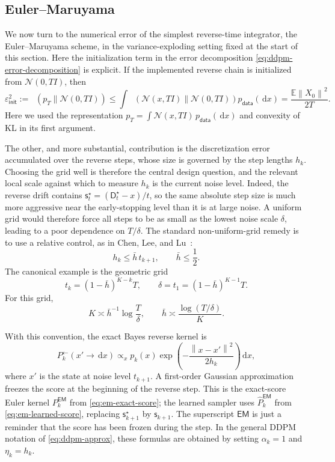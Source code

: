 \documentclass[10pt,a4paper]{amsart}
\numberwithin{equation}{section}
\DeclareMathOperator{\KL}{D_{\mathsf{KL}}}
\newcommand{\E}{\mathbb{E}}
\newcommand{\dd}{\,\mathrm{d}}
\newcommand{\Id}{I}
\newcommand{\wh}[1]{\widehat{#1}}
\newcommand{\norm}[1]{\left\lVert #1 \right\rVert}
\newcommand{\pdata}{p_{\mathsf{data}}}
\newcommand{\sstar}{\mathsf{s}^{\star}}
\newcommand{\score}{\mathsf{s}}
\newcommand{\dstar}{\mathsf{D}^{\star}}
\newcommand{\epsinit}{\varepsilon_{\mathsf{init}}}
\newcommand{\normal}[2]{\mathcal{N}\!\left(#1,#2\right)}
\begin{document}
\subsection{Euler--Maruyama}

We now turn to the numerical error of the simplest reverse-time integrator, the
Euler--Maruyama scheme, in the variance-exploding setting fixed at the start of
this section.  Here the initialization term in the error decomposition
\eqref{eq:ddpm-error-decomposition} is explicit.  If the implemented
reverse chain is initialized from $\normal{0}{T\Id}$, then
\begin{equation}\label{eq:ve-init-kl}
    \epsinit^2
    :=
    \KL(p_T\|\normal{0}{T\Id})
    \leq
    \int
    \KL\!\left(\normal{x}{T\Id}\middle\|\normal{0}{T\Id}\right)
    \pdata(\dd x)
    =
    \frac{\E\norm{X_0}^2}{2T}.
\end{equation}
Here we used the representation
$p_T=\int\normal{x}{T\Id}\,\pdata(\dd x)$ and convexity of KL in its first
argument.

The other, and more substantial, contribution is the discretization error
accumulated over the reverse steps, whose size is governed by the step lengths
$h_k$.  Choosing the grid well is therefore the central design question, and the
relevant local scale against which to measure $h_k$ is the current noise level.
Indeed, the reverse drift contains
$\sstar_t=(\dstar_t-x)/t$, so the same absolute step size is much more
aggressive near the early-stopping level than it is at large noise.  A uniform
grid would therefore force all steps to be as small as the lowest noise scale
$\delta$, leading to a poor dependence on $T/\delta$.  The standard
non-uniform-grid remedy is to use a relative control, as in Chen, Lee, and Lu~\cite{chen2023improvedsgm}:
\begin{equation}\label{eq:relative-mesh}
    h_k\leq \bar h\,t_{k+1},
    \qquad
    \bar h\leq \frac12.
\end{equation}
The canonical example is the geometric grid
\begin{equation}\label{eq:geometric-ve-grid}
    t_k=(1-\bar h)^{K-k}T,
    \qquad
    \delta=t_1=(1-\bar h)^{K-1}T.
\end{equation}
For this grid,
\[
    K\asymp \bar h^{-1}\log\frac{T}{\delta},
    \qquad
    \bar h\asymp \frac{\log(T/\delta)}{K}.
\]

With this convention, the exact Bayes reverse kernel is
\begin{equation}\label{eq:ve-backward-kernel}
    P_k^{\leftarrow}(x' \to \dd x)
    \propto_x
    p_k(x)
    \exp\!\left(-\frac{\norm{x-x'}^2}{2h_k}\right)\dd x,
\end{equation}
where $x'$ is the state at noise level $t_{k+1}$.  A first-order Gaussian
approximation freezes the score at the beginning of the reverse step.  This is
the exact-score Euler kernel $P_k^{\mathsf{EM}}$ from
\eqref{eq:em-exact-score}; the learned sampler uses
$\wh P_k^{\mathsf{EM}}$ from \eqref{eq:em-learned-score}, replacing
$\sstar_{k+1}$ by $\score_{k+1}$.
The superscript $\mathsf{EM}$ is just a reminder that the score has been
frozen during the step.  In the general DDPM notation of
\eqref{eq:ddpm-approx}, these formulas are obtained by setting
$\alpha_k=1$ and $\eta_k=h_k$.
\end{document}
